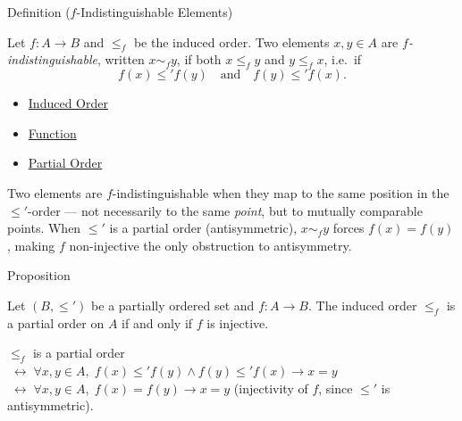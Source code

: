 
\begin{definitionbox}{Definition ($f$-Indistinguishable Elements)}
\begin{definition}\label{def:f-indist}
Let $f : A \to B$ and $\leq_f$ be the induced order. Two elements
$x, y \in A$ are \emph{$f$-indistinguishable}, written $x \sim_f y$,
if both $x \leq_f y$ and $y \leq_f x$, i.e.\ if
\[
f(x) \leq' f(y) \quad \text{and} \quad f(y) \leq' f(x).
\]
\end{definition}
\end{definitionbox}

\begin{dependencies}
\begin{itemize}
  \item \hyperref[def:induced-order]{Induced Order}
  \item \hyperref[def:function]{Function}
  \item \hyperref[def:partial-order]{Partial Order}
\end{itemize}
\end{dependencies}

\begin{remark*}[Intuition]
Two elements are $f$-indistinguishable when they map to the same position
in the $\leq'$-order — not necessarily to the same \emph{point}, but to
mutually comparable points. When $\leq'$ is a partial order (antisymmetric),
$x \sim_f y$ forces $f(x) = f(y)$, making $f$ non-injective the only
obstruction to antisymmetry.
\end{remark*}

\begin{propositionbox}{Proposition}
\begin{proposition}\label{prop:induced-poset}
Let $(B, \leq')$ be a partially ordered set and $f : A \to B$.
The induced order $\leq_f$ is a partial order on $A$ if and only if
$f$ is injective.
\end{proposition}
\end{propositionbox}

\begin{remark*}
$\leq_f$ is a partial order $\;\leftrightarrow\; \forall x,y \in A,\; f(x)\leq' f(y) \wedge f(y)\leq' f(x) \to x=y$ $\;\leftrightarrow\; \forall x,y \in A,\; f(x)=f(y) \to x=y$ (injectivity of $f$, since $\leq'$ is antisymmetric).
\end{remark*}

